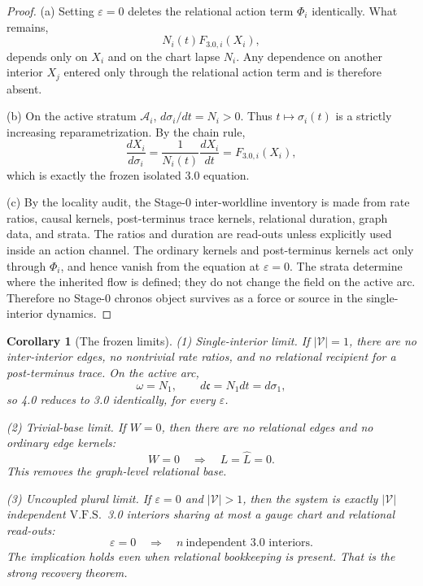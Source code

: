 \documentclass[11pt,a4paper]{article}
\newcommand{\VFS}{\ensuremath{\mathrm{V.F.S.}}}
\theoremstyle{definition}
\theoremstyle{plain}
\newtheorem{corollary}[definition]{Corollary}
\theoremstyle{remark}
\begin{document}
\begin{proof}
(a) Setting \(\varepsilon=0\) deletes the relational action term \(\Phi_i\)
identically. What remains,
\[
N_i(t)F_{3.0,i}(X_i),
\]
depends only on \(X_i\) and on the chart lapse \(N_i\). Any dependence on another
interior \(X_j\) entered only through the relational action term and is therefore
absent.

(b) On the active stratum \(\mathcal A_i\), \(d\sigma_i/dt=N_i>0\). Thus
\(t\mapsto\sigma_i(t)\) is a strictly increasing reparametrization. By the chain
rule,
\[
\frac{dX_i}{d\sigma_i}
=
\frac{1}{N_i(t)}\frac{dX_i}{dt}
=
F_{3.0,i}(X_i),
\]
which is exactly the frozen isolated 3.0 equation.

(c) By the locality audit, the Stage-0 inter-worldline inventory is made from
rate ratios, causal kernels, post-terminus trace kernels, relational duration,
graph data, and strata. The ratios and duration are read-outs unless explicitly
used inside an action channel. The ordinary kernels and post-terminus kernels act
only through \(\Phi_i\), and hence vanish from the equation at \(\varepsilon=0\).
The strata determine where the inherited flow is defined; they do not change the
field on the active arc. Therefore no Stage-0 chronos object survives as a force
or source in the single-interior dynamics. \qedhere
\end{proof}

\begin{corollary}[The frozen limits]\label{cor:limits}
\textup{(1)} \emph{Single-interior limit.}
If \(|\mathcal V|=1\), there are no inter-interior edges, no nontrivial rate ratios,
and no relational recipient for a post-terminus trace. On the active arc,
\[
\omega=N_1,
\qquad
d\mathfrak c=N_1dt=d\sigma_1,
\]
so 4.0 reduces to 3.0 identically, for every \(\varepsilon\).

\textup{(2)} \emph{Trivial-base limit.}
If \(W=0\), then there are no relational edges and no ordinary edge kernels:
\[
W=0
\quad\Longrightarrow\quad
L=\hat L=0.
\]
This removes the graph-level relational base.

\textup{(3)} \emph{Uncoupled plural limit.}
If \(\varepsilon=0\) and \(|\mathcal V|>1\), then the system is exactly
\(|\mathcal V|\) independent \VFS\ 3.0 interiors sharing at most a gauge chart and
relational read-outs:
\[
\varepsilon=0
\quad\Longrightarrow\quad
n\ \text{independent 3.0 interiors}.
\]
The implication holds even when relational bookkeeping is present. That is the
strong recovery theorem.
\end{corollary}
\end{document}
